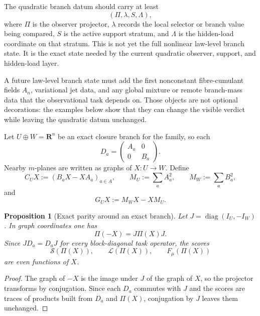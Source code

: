 \documentclass[11pt,a4paper]{article}
\numberwithin{equation}{section}
\DeclareMathOperator{\diag}{diag}
\newcommand{\R}{\mathbf R}
\theoremstyle{thmcompact}
\newtheorem{proposition}[theorem]{Proposition}
\theoremstyle{remark}
\begin{document}
The quadratic branch datum should carry at least
\begin{equation}
(\Pi,\lambda,S,\Lambda),
\label{eq:branch-datum}
\end{equation}
where $\Pi$ is the observer projector, $\lambda$ records the local selector or branch value being compared, $S$ is the active support stratum, and $\Lambda$ is the hidden-load coordinate on that stratum. This is not yet the full nonlinear law-level branch state. It is the exact state needed by the current quadratic observer, support, and hidden-load layer.

A future law-level branch state must add the first nonconstant fibre-cumulant fields $A_n$, variational jet data, and any global mixture or remote branch-mass data that the observational task depends on. Those objects are not optional decorations: the examples below show that they can change the visible verdict while leaving the quadratic datum unchanged.

Let $U\oplus W=\R^n$ be an exact closure branch for the family, so each
\[
D_a=\begin{pmatrix}A_a&0\\0&B_a\end{pmatrix}.
\]
Nearby $m$-planes are written as graphs of $X:U\to W$. Define
\[
C_UX:=(B_aX-XA_a)_{a\in A},
\qquad
M_U:=\sum_aA_a^2,
\qquad
M_W:=\sum_aB_a^2,
\]
and
\[
G_UX:=M_WX-XM_U.
\]

\begin{proposition}[Exact parity around an exact branch]
\label{prop:branch-parity}
Let $J=\diag(I_U,-I_W)$. In graph coordinates one has
\[
\Pi(-X)=J\Pi(X)J.
\]
Since $JD_a=D_aJ$ for every block-diagonal task operator, the scores
\[
\mathcal S(\Pi(X)),\qquad \mathcal L(\Pi(X)),\qquad F_\mu(\Pi(X))
\]
are even functions of $X$.
\end{proposition}

\begin{proof}
The graph of $-X$ is the image under $J$ of the graph of $X$, so the projector transforms by conjugation. Since each $D_a$ commutes with $J$ and the scores are traces of products built from $D_a$ and $\Pi(X)$, conjugation by $J$ leaves them unchanged.
\end{proof}
\end{document}
